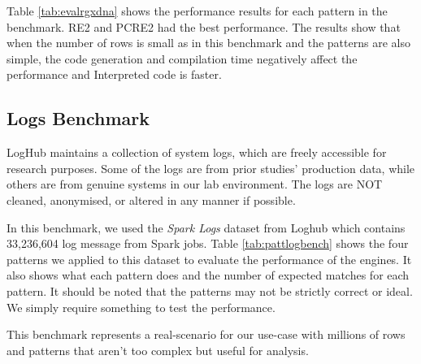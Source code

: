 Table \ref{tab:evalrgxdna} shows the performance results for each pattern in the benchmark. RE2 and PCRE2 had the best performance. The results show that when the number of rows is small as in this benchmark and the patterns are also simple, the code generation and compilation time negatively affect the performance and Interpreted code is faster.

\subsection{Logs Benchmark}

LogHub \cite{loghub} maintains a collection of system logs, which are freely accessible for research purposes. Some of the logs are from prior studies' production data, while others are from genuine systems in our lab environment. The logs are NOT cleaned, anonymised, or altered in any manner if possible.

In this benchmark, we used the \textit{Spark Logs} dataset from Loghub which contains 33,236,604 log message from Spark jobs. Table \ref{tab:pattlogbench} shows the four patterns we applied to this dataset to evaluate the performance of the engines. It also shows what each pattern does and the number of expected matches for each pattern. It should be noted that the patterns may not be strictly correct or ideal. We simply require something to test the performance.

This benchmark represents a real-scenario for our use-case with millions of rows and patterns that aren't too complex but useful for analysis.

{\renewcommand{\arraystretch}{1.5}%
\begin{table}[H]
\centering
\small
{}
\caption{Patterns Used in Log Benchmark and Number of Matches.}\label{tab:pattlogbench}
\end{table}
}

